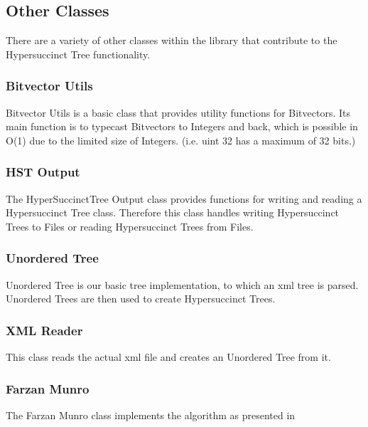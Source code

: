 \documentclass{article}
\begin{document}
\subsection{Other Classes}
There are a variety of other classes within the library that contribute to the Hypersuccinct Tree functionality.
\subsubsection{Bitvector Utils}
Bitvector Utils is a basic class that provides utility functions for Bitvectors. Its main function is to typecast Bitvectors to Integers and back, which is possible in O(1) due to the limited size of Integers. (i.e. uint 32 has a maximum of 32 bits.)
\subsubsection{HST Output}
The HyperSuccinctTree Output class provides functions for writing and reading a Hypersuccinct Tree class. Therefore this class handles writing Hypersuccinct Trees to Files or reading Hypersuccinct Trees from Files.
\subsubsection{Unordered Tree}
Unordered Tree is our basic tree implementation, to which an xml tree is parsed. Unordered Trees are then used to create Hypersuccinct Trees.
\subsubsection{XML Reader}
This class reads the actual xml file and creates an Unordered Tree from it.
\subsubsection{Farzan Munro}
The Farzan Munro class implements the algorithm as presented in \cite{farzanMunro}



\end{document}
